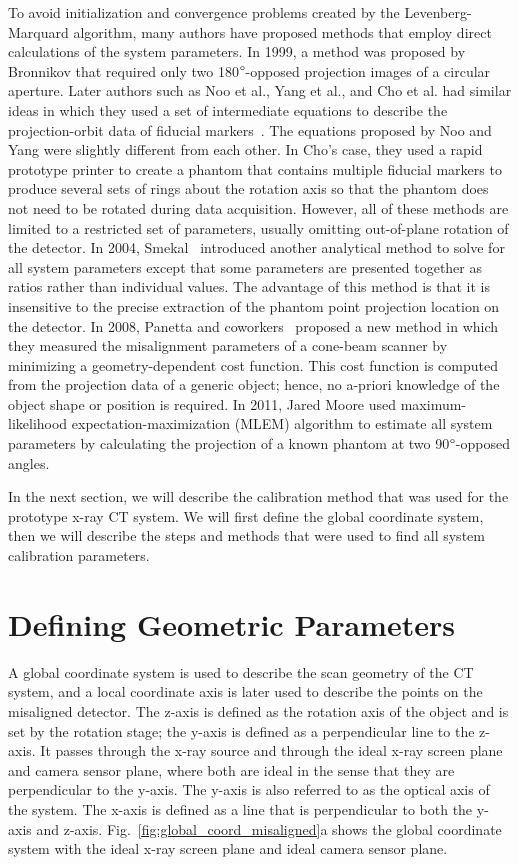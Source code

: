 To avoid initialization and convergence problems created by the Levenberg-Marquard algorithm, many authors have proposed methods that employ direct calculations of the system parameters.  In 1999, a method was proposed by Bronnikov that required only two 180$\degree$-opposed projection images of  a circular aperture.  Later authors such as Noo et al., Yang et al., and Cho et al. had similar ideas in which they used a set of intermediate equations to describe the projection-orbit data of fiducial markers~\citep{Noo2000, Yang2006, Cho2005}.  The equations proposed by Noo and Yang were slightly different from each other.  In Cho's case, they used a rapid prototype printer to create a phantom that contains multiple fiducial markers to produce several sets of rings about the rotation axis so that the phantom does not need to be rotated during data acquisition.  However, all of these methods are limited to a restricted set of parameters, usually omitting out-of-plane rotation of the detector.  In 2004, Smekal~\citep{Smekal2004} introduced another analytical method to solve for all system parameters except that some parameters are presented together as ratios rather than individual values.  The advantage of this method is that it is insensitive to the precise extraction of the phantom point projection location on the detector.  In 2008, Panetta and coworkers~\citep{Panetta2008} proposed a new method in which they measured the misalignment parameters of a cone-beam scanner by minimizing a geometry-dependent cost function.  This cost function is computed from the projection data of a generic object; hence, no a-priori knowledge of the object shape or position is required.  In 2011, Jared Moore used maximum-likelihood expectation-maximization (MLEM) algorithm to estimate all system parameters by calculating the projection of a known phantom at two 90$\degree$-opposed angles.

In the next section, we will describe the calibration method that was used for the prototype x-ray CT system.  We will first define the global coordinate system, then we will describe the steps and methods that were used to find all system calibration parameters.

\section{Defining Geometric Parameters}
A global coordinate system is used to describe the scan geometry of the CT system, and a local coordinate axis is later used to describe the points on the misaligned detector.  The z-axis is defined as the rotation axis of the object and is set by the rotation stage; the y-axis is defined as a perpendicular line to the z-axis.  It passes through the x-ray source and through the ideal x-ray screen plane and camera sensor plane, where both are ideal in the sense that they are perpendicular to the y-axis.  The y-axis is also referred to as the optical axis of the system.  The x-axis is defined as a line that is perpendicular to both the y-axis and z-axis.  Fig.~\ref{fig:global_coord_misaligned}a shows the global coordinate system with the ideal x-ray screen plane and ideal camera sensor plane.  

